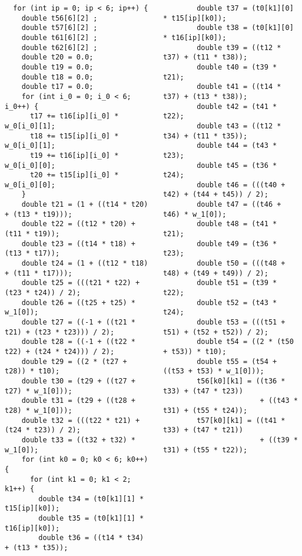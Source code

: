 \documentclass[presentation]{beamer}
\begin{document}
\begin{frame}
\begin{columns}
\begin{column}{0.5\textwidth}
\begin{verbatim}
  for (int ip = 0; ip < 6; ip++) {
    double t56[6][2] ;
    double t57[6][2] ;
    double t61[6][2] ;
    double t62[6][2] ;
    double t20 = 0.0;
    double t19 = 0.0;
    double t18 = 0.0;
    double t17 = 0.0;
    for (int i_0 = 0; i_0 < 6; i_0++) {
      t17 += t16[ip][i_0] * w_0[i_0][1];
      t18 += t15[ip][i_0] * w_0[i_0][1];
      t19 += t16[ip][i_0] * w_0[i_0][0];
      t20 += t15[ip][i_0] * w_0[i_0][0];
    }
    double t21 = (1 + ((t14 * t20) + (t13 * t19)));
    double t22 = ((t12 * t20) + (t11 * t19));
    double t23 = ((t14 * t18) + (t13 * t17));
    double t24 = (1 + ((t12 * t18) + (t11 * t17)));
    double t25 = (((t21 * t22) + (t23 * t24)) / 2);
    double t26 = ((t25 + t25) * w_1[0]);
    double t27 = ((-1 + ((t21 * t21) + (t23 * t23))) / 2);
    double t28 = ((-1 + ((t22 * t22) + (t24 * t24))) / 2);
    double t29 = ((2 * (t27 + t28)) * t10);
    double t30 = (t29 + ((t27 + t27) * w_1[0]));
    double t31 = (t29 + ((t28 + t28) * w_1[0]));
    double t32 = (((t22 * t21) + (t24 * t23)) / 2);
    double t33 = ((t32 + t32) * w_1[0]);
    for (int k0 = 0; k0 < 6; k0++) {
      for (int k1 = 0; k1 < 2; k1++) {
        double t34 = (t0[k1][1] * t15[ip][k0]);
        double t35 = (t0[k1][1] * t16[ip][k0]);
        double t36 = ((t14 * t34) + (t13 * t35));
\end{verbatim}
    \end{column}
    \begin{column}{0.5\textwidth}
\begin{verbatim}
        double t37 = (t0[k1][0] * t15[ip][k0]);
        double t38 = (t0[k1][0] * t16[ip][k0]);
        double t39 = ((t12 * t37) + (t11 * t38));
        double t40 = (t39 * t21);
        double t41 = ((t14 * t37) + (t13 * t38));
        double t42 = (t41 * t22);
        double t43 = ((t12 * t34) + (t11 * t35));
        double t44 = (t43 * t23);
        double t45 = (t36 * t24);
        double t46 = (((t40 + t42) + (t44 + t45)) / 2);
        double t47 = ((t46 + t46) * w_1[0]);
        double t48 = (t41 * t21);
        double t49 = (t36 * t23);
        double t50 = (((t48 + t48) + (t49 + t49)) / 2);
        double t51 = (t39 * t22);
        double t52 = (t43 * t24);
        double t53 = (((t51 + t51) + (t52 + t52)) / 2);
        double t54 = ((2 * (t50 + t53)) * t10);
        double t55 = (t54 + ((t53 + t53) * w_1[0]));
        t56[k0][k1] = ((t36 * t33) + (t47 * t23))
                       + ((t43 * t31) + (t55 * t24));
        t57[k0][k1] = ((t41 * t33) + (t47 * t21))
                       + ((t39 * t31) + (t55 * t22));

\end{verbatim}
\end{column}
\end{columns}
\end{frame}
\end{document}

